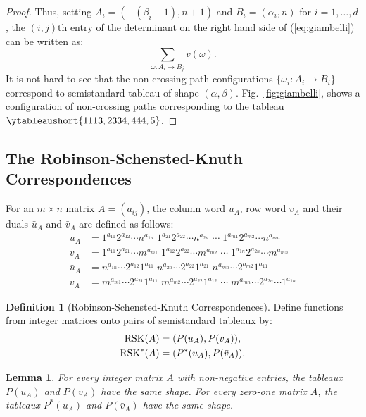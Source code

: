 \documentclass[11pt]{amsart}
\newtheorem{lemma}[theorem]{Lemma}
\theoremstyle{definition}
\newtheorem{definition}[theorem]{Definition}
\theoremstyle{example}
\newcommand{\rsk}{\textup{RSK}}
\begin{document}
\begin{proof}
  Thus, setting $A_i=(-(\beta_i-1),n+1)$ and $B_i=(\alpha_i,n)$ for $i=1,\dotsc,d$, 
  the $(i,j)$th entry of the determinant on the right hand side of (\ref{eq:giambelli}) can be written as:
  \begin{equation}
    \label{eq:giambelli-det}
    \sum_{\omega:A_i\to B_j} v(\omega).
  \end{equation}
  It is not hard to see that the non-crossing path configurations $\{\omega_i:A_i\to B_i\}$ correspond to semistandard tableau of shape $(\alpha,\beta)$.
  Fig.~\ref{fig:giambelli}, shows a configuration of non-crossing paths corresponding to the tableau $\ytableaushort{1113,2334,444,5}$.
\end{proof}
\subsection{The Robinson-Schensted-Knuth Correspondences}
\label{sec:rsk}
For an $m\times n$ matrix $A=(a_{ij})$, the column word $u_A$, row word $v_A$ and their duals $\bar u_A$ and $\bar v_A$ are defined as follows:
\begin{align*}
  u_A &= 1^{a_{11}}2^{a_{12}}\dotsb n^{a_{1n}} \; 1^{a_{21}} 2^{a_{22}} \dotsb n^{a_{2n}} \; \dotsb \; 1^{a_{m1}} 2^{a_{m2}} \dotsb n^{a_{mn}}\\
  v_A &= 1^{a_{11}}2^{a_{21}}\dotsb m^{a_{m1}} \; 1^{a_{12}} 2^{a_{22}} \dotsb m^{a_{m2}} \; \dotsb \; 1^{a_{1n}} 2^{a_{2n}} \dotsb m^{a_{mn}}\\
  \bar u_A &= n^{a_{1n}} \dotsb 2^{a_{12}}1^{a_{11}}\; n^{a_{2n}}\dotsb 2^{a_{22}}1^{a_{21}} \; n^{a_{mn}} \dotsb 2^{a_{m2}} 1^{a_{11}}\\
  \bar v _A &= m^{a_{m1}}\dotsb 2^{a_{21}}1^{a_{11}} \; m^{a_{m2}}\dotsb 2^{a_{22}} 1^{a_{12}} \; \dotsb \; m^{a_{mn}}\dotsb  2^{a_{2n}} \dotsb 1^{a_{1n}}
\end{align*}
\begin{definition}
  [Robinson-Schensted-Knuth Correspondences]
  Define functions from integer matrices onto pairs of semistandard tableaux by:
  \begin{align*}
    \rsk(A) & = (P(u_A), P(v_A)),\\
    \rsk^*(A) & = (P^*(u_A), P(\bar v_A)).
  \end{align*}
\end{definition}
\begin{lemma}
  \label{lemma:same_shape}
  For every integer matrix $A$ with non-negative entries, the tableaux $P(u_A)$ and $P(v_A)$ have the same shape.
  For every zero-one matrix $A$, the tableaux $P^*(u_A)$ and $P(\bar v_A)$ have the same shape.
\end{lemma}
\end{document}
